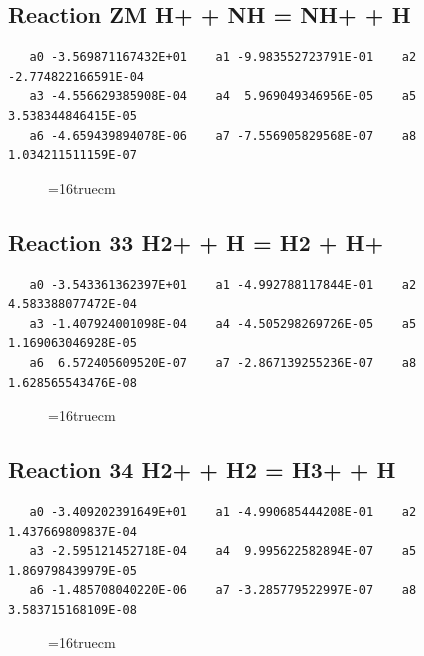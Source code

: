 \documentclass[12pt,dvipdfm]{article}
\begin{document}
\subsection{
Reaction ZM H+ + NH = NH+ + H}
\begin{small}\begin{verbatim}
   a0 -3.569871167432E+01    a1 -9.983552723791E-01    a2 -2.774822166591E-04
   a3 -4.556629385908E-04    a4  5.969049346956E-05    a5  3.538344846415E-05
   a6 -4.659439894078E-06    a7 -7.556905829568E-07    a8  1.034211511159E-07
   \end{verbatim}\end{small}
\begin{figure}[h!] \label{n2rates}
\epsfxsize=16truecm
\end{figure}
\newpage

\subsection{
Reaction 33 H2+ + H = H2 + H+}
\begin{small}\begin{verbatim}
   a0 -3.543361362397E+01    a1 -4.992788117844E-01    a2  4.583388077472E-04
   a3 -1.407924001098E-04    a4 -4.505298269726E-05    a5  1.169063046928E-05
   a6  6.572405609520E-07    a7 -2.867139255236E-07    a8  1.628565543476E-08
   \end{verbatim}\end{small}
\begin{figure}[h!] \label{n2rates}
\epsfxsize=16truecm
\end{figure}
\newpage

\subsection{
Reaction 34 H2+ + H2 = H3+ + H}
\begin{small}\begin{verbatim}
   a0 -3.409202391649E+01    a1 -4.990685444208E-01    a2  1.437669809837E-04
   a3 -2.595121452718E-04    a4  9.995622582894E-07    a5  1.869798439979E-05
   a6 -1.485708040220E-06    a7 -3.285779522997E-07    a8  3.583715168109E-08
   \end{verbatim}\end{small}
\begin{figure}[h!] \label{n2rates}
\epsfxsize=16truecm
\end{figure}
\newpage
\end{document}
